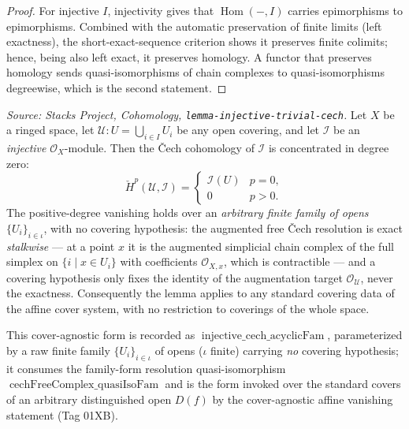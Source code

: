\begin{proof}
  For injective \(I\), injectivity gives that \(\operatorname{Hom}(-, I)\) carries
  epimorphisms to epimorphisms. Combined with the automatic preservation of finite limits
  (left exactness), the short-exact-sequence criterion shows it preserves finite colimits;
  hence, being also left exact, it preserves homology. A functor that preserves homology
  sends quasi-isomorphisms of chain complexes to quasi-isomorphisms degreewise, which is
  the second statement.
\end{proof}

\begin{lemma}
  \label{mk-lem:injective_cech_acyclic}

  \textit{Source: Stacks Project, Cohomology,
  \texttt{lemma-injective-trivial-cech}.}
  Let \(X\) be a ringed space, let \(\mathcal{U} : U =
  \bigcup_{i \in I} U_i\) be any open covering, and let \(\mathcal{I}\) be an
  \emph{injective} \(\mathcal{O}_X\)-module. Then the {\v C}ech cohomology of
  \(\mathcal{I}\) is concentrated in degree zero:
  \[
    \check{H}^p(\mathcal{U}, \mathcal{I}) =
    \begin{cases}
      \mathcal{I}(U) & p = 0, \\
      0 & p > 0.
    \end{cases}
  \]
  The positive-degree vanishing holds over an \emph{arbitrary finite family of opens}
  \(\{U_i\}_{i \in \iota}\), with no covering hypothesis: the augmented free {\v C}ech
  resolution is exact \emph{stalkwise} — at a point \(x\) it is the augmented simplicial
  chain complex of the full simplex on \(\{i \mid x \in U_i\}\) with coefficients
  \(\mathcal{O}_{X,x}\), which is contractible — and a covering hypothesis only fixes the
  identity of the augmentation target \(\mathcal{O}_{\mathcal{U}}\), never the exactness.
  Consequently the lemma applies to any standard covering data of the affine cover system,
  with no restriction to coverings of the whole space.

  This cover-agnostic form is recorded as \(\operatorname{injective\_cech\_acyclicFam}\),
  parameterized by a raw finite family \(\{U_i\}_{i \in \iota}\) of opens
  (\(\iota\) finite) carrying \emph{no} covering hypothesis; it consumes the family-form
  resolution quasi-isomorphism \(\operatorname{cechFreeComplex\_quasiIsoFam}\) and is the
  form invoked over the standard covers of an arbitrary distinguished open \(D(f)\) by the
  cover-agnostic affine vanishing statement (Tag 01XB).
\end{lemma}
